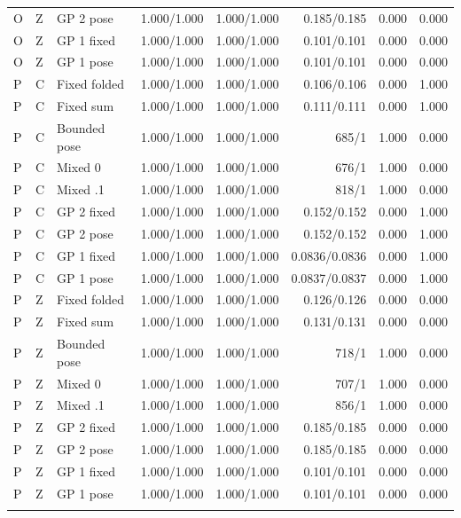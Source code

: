 \begin{table}[!t]
\begin{tabular}{lllrrrrr}
O & Z & GP 2 pose & 1.000/1.000 & 1.000/1.000 & 0.185/0.185 & 0.000 & 0.000 \\
O & Z & GP 1 fixed & 1.000/1.000 & 1.000/1.000 & 0.101/0.101 & 0.000 & 0.000 \\
O & Z & GP 1 pose & 1.000/1.000 & 1.000/1.000 & 0.101/0.101 & 0.000 & 0.000 \\
\addlinespace
P & C & Fixed folded & 1.000/1.000 & 1.000/1.000 & 0.106/0.106 & 0.000 & 1.000 \\
P & C & Fixed sum & 1.000/1.000 & 1.000/1.000 & 0.111/0.111 & 0.000 & 1.000 \\
P & C & Bounded pose & 1.000/1.000 & 1.000/1.000 & 685/1 & 1.000 & 0.000 \\
P & C & Mixed 0 & 1.000/1.000 & 1.000/1.000 & 676/1 & 1.000 & 0.000 \\
P & C & Mixed .1 & 1.000/1.000 & 1.000/1.000 & 818/1 & 1.000 & 0.000 \\
P & C & GP 2 fixed & 1.000/1.000 & 1.000/1.000 & 0.152/0.152 & 0.000 & 1.000 \\
P & C & GP 2 pose & 1.000/1.000 & 1.000/1.000 & 0.152/0.152 & 0.000 & 1.000 \\
P & C & GP 1 fixed & 1.000/1.000 & 1.000/1.000 & 0.0836/0.0836 & 0.000 & 1.000 \\
P & C & GP 1 pose & 1.000/1.000 & 1.000/1.000 & 0.0837/0.0837 & 0.000 & 1.000 \\
\addlinespace
P & Z & Fixed folded & 1.000/1.000 & 1.000/1.000 & 0.126/0.126 & 0.000 & 0.000 \\
P & Z & Fixed sum & 1.000/1.000 & 1.000/1.000 & 0.131/0.131 & 0.000 & 0.000 \\
P & Z & Bounded pose & 1.000/1.000 & 1.000/1.000 & 718/1 & 1.000 & 0.000 \\
P & Z & Mixed 0 & 1.000/1.000 & 1.000/1.000 & 707/1 & 1.000 & 0.000 \\
P & Z & Mixed .1 & 1.000/1.000 & 1.000/1.000 & 856/1 & 1.000 & 0.000 \\
P & Z & GP 2 fixed & 1.000/1.000 & 1.000/1.000 & 0.185/0.185 & 0.000 & 0.000 \\
P & Z & GP 2 pose & 1.000/1.000 & 1.000/1.000 & 0.185/0.185 & 0.000 & 0.000 \\
P & Z & GP 1 fixed & 1.000/1.000 & 1.000/1.000 & 0.101/0.101 & 0.000 & 0.000 \\
P & Z & GP 1 pose & 1.000/1.000 & 1.000/1.000 & 0.101/0.101 & 0.000 & 0.000 \\
\addlinespace
\bottomrule
\end{tabular}
\end{table}
